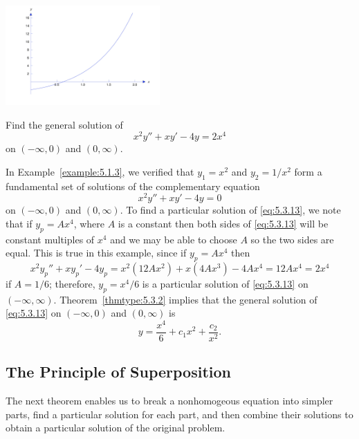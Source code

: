 \documentclass{ximera}
\begin{document}
\begin{example}
\begin{explanation}
\begin{image}
  \includegraphics[height=1.5in]{fig050302.jpg}
\end{image}
 
\end{explanation}
\end{example}
 
\begin{example}\label{example:5.3.3}
Find the general solution of
\begin{equation} \label{eq:5.3.13}
x^2y''+xy'-4y=2x^4
\end{equation}
on $(-\infty,0)$ and $(0,\infty)$.
 
 
\begin{explanation}
In Example~\ref{example:5.1.3},  we verified that $y_1=x^2$ and $y_2=1/x^2$
form a fundamental set of solutions of the complementary equation
$$
x^2y''+xy'-4y=0
$$
on $(-\infty,0)$ and $(0,\infty)$.  To find a particular solution of
\eqref{eq:5.3.13}, we note that if
$y_p=Ax^4$, where $A$ is a constant then  both sides of \eqref{eq:5.3.13}
will be constant
multiples  of $x^4$ and  we may be able to choose  $A$ so the two sides
are equal. This is true in this example, since if $y_p=Ax^4$ then
$$
x^2y_p''+xy_p'-4y_p=x^2(12Ax^2)+x(4Ax^3)-4Ax^4=12Ax^4=2x^4
$$
if $A=1/6$;  therefore, $y_p=x^4/6$ is a particular solution of
\eqref{eq:5.3.13} on  $(-\infty,\infty)$.
Theorem~\ref{thmtype:5.3.2} implies that the general solution of
\eqref{eq:5.3.13} on  $(-\infty,0)$ and  $(0,\infty)$ is
$$
y=\frac{x^4}{6}+c_1x^2+\frac{c_2}{x^2}.
$$
\end{explanation}
\end{example}
 
\subsection*{The Principle of Superposition}
 
The next theorem enables us to break a nonhomogeous equation into
simpler parts, find a particular solution for each part, and then
combine their solutions to obtain a particular solution of the
original problem.
 
\end{document}
